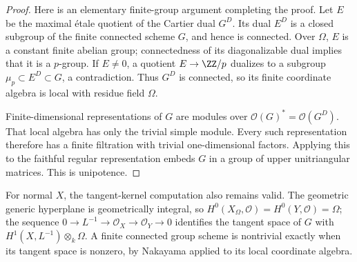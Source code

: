 \begin{proof}
Here is an elementary finite-group argument completing the proof.
Let $E$ be the maximal étale quotient of the Cartier dual $G^D$.
Its dual $E^D$ is a closed subgroup of the finite connected scheme
$G$, and hence is connected. Over $\Omega$, $E$ is a constant finite
abelian group; connectedness of its diagonalizable dual implies
that it is a $p$-group. If $E\ne0$, a quotient $E\to\ZZ/p$ dualizes
to a subgroup $\mu_p\subset E^D\subset G$, a contradiction.
Thus $G^D$ is connected, so its finite coordinate algebra is local
with residue field $\Omega$.

Finite-dimensional representations of $G$ are modules over
$\mathcal O(G)^*=\mathcal O(G^D)$. That local algebra has only the
trivial simple module. Every such representation therefore has a
finite filtration with trivial one-dimensional factors. Applying
this to the faithful regular representation embeds $G$ in a group
of upper unitriangular matrices. This is unipotence.
\end{proof}

For normal $X$, the tangent-kernel computation also remains valid.
The geometric generic hyperplane is geometrically integral, so
$H^0(X_\Omega,\mathcal O)=H^0(Y,\mathcal O)=\Omega$; the sequence
$0\to L^{-1}\to\mathcal O_X\to\mathcal O_Y\to0$ identifies the tangent
space of $G$ with $H^1(X,L^{-1})\otimes_k\Omega$. A finite connected
group scheme is nontrivial exactly when its tangent space is nonzero,
by Nakayama applied to its local coordinate algebra.
